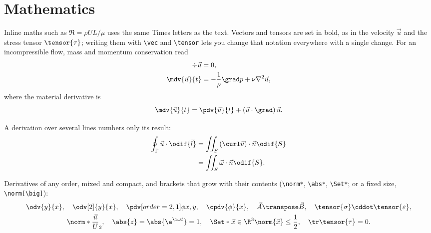 \section{Mathematics}\label{sec:maths}

Inline maths such as $\Re = \rho U L / \mu$ uses the same Times letters as the text. Vectors and tensors are set in bold, as in the velocity $\vec{u}$ and the stress tensor $\tensor{\tau}$; writing them with \verb|\vec| and \verb|\tensor| lets you change that notation everywhere with a single change. For an incompressible flow, mass and momentum conservation read
\begin{align}
    \div \vec{u} &= 0, \label{eq:continuity} \\
    \mdv{\vec{u}}{t} &= -\frac{1}{\rho} \grad p + \nu \nabla^2 \vec{u}, \label{eq:navier-stokes}
\end{align}
where the material derivative is
\begin{equation}
    \mdv{\vec{u}}{t} = \pdv{\vec{u}}{t} + \left( \vec{u} \cdot \grad \right) \vec{u}.
\end{equation}

A derivation over several lines numbers only its result:
\begin{align}
    \oint_{\Gamma} \vec{u} \cdot \odif{\vec{l}}
        &= \iint_{S} \left( \curl \vec{u} \right) \cdot \vec{n} \odif{S} \notag \\
        &= \iint_{S} \vec{\omega} \cdot \vec{n} \odif{S}. \label{eq:circulation}
\end{align}

Derivatives of any order, mixed and compact, and brackets that grow with their contents (\verb|\norm*|, \verb|\abs*|, \verb|\Set*|; or a fixed size, \verb|\norm[\big]|):
\begin{gather*}
    \odv{y}{x}, \quad \odv[2]{y}{x}, \quad \pdv[order={2,1}]{\phi}{x,y}, \quad \cpdv{\phi}{x}, \quad \vec{A}\transpose \vec{B}, \quad \tensor{\sigma} \cddot \tensor{\varepsilon}, \\
    \norm*{\frac{\vec{u}}{U}}_2, \quad \abs{z} = \abs{\e^{\i\omega t}} = 1, \quad \Set*{\vec{x} \in \R^3}{\norm{\vec{x}} \leq \frac{1}{2}}, \quad \tr \tensor{\tau} = 0.
\end{gather*}

